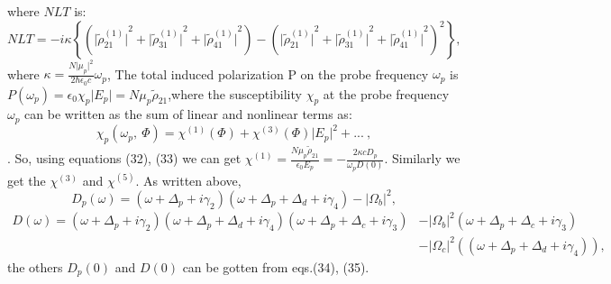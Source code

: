 \documentclass[12pt,a4paper]{article}
\begin{document}
where \(NLT\) is:
\begin{equation}
      {NLT} =  {-i\kappa}{\left\lbrace{{\left({\vert\tilde\rho^{(1)}_{21}\vert}^{2}+{\vert\tilde\rho^{(1)}_{31}\vert}^{2}+{\vert\tilde\rho^{(1)}_{41}\vert}^{2}\right)}-{\left({\vert\tilde\rho^{(1)}_{21}\vert}^{2}+{\vert\tilde\rho^{(1)}_{31}\vert}^{2}+{\vert\tilde\rho^{(1)}_{41}\vert}^{2}\right)}^2}\right\rbrace},
\end{equation}
where \(\kappa=\frac{N\vert\mu_p\vert^2}{2\hbar\epsilon_0c}\omega_p\), The total induced polarization P on the probe frequency \(\omega_p\) is \({P}(\omega_p)=\epsilon_0\chi_p\vert E_p\vert=N\mu_p\tilde\rho_{21}\),where the susceptibility \(\chi_p\) at the probe frequency \(\omega_p\) can be written as the sum of linear and nonlinear terms as:
\begin{equation}
    \chi_p(\omega_p,\ \Phi)=\chi^{(1)}(\Phi)+\chi^{(3)}(\Phi)\vert E_p\vert^2+...\ ,
\end{equation}.
So, using equations (32), (33) we can get \(\chi^{(1)}=\frac{N\mu_p\tilde\rho_{21}}{\epsilon_0E_p}=-\frac{2\kappa cD_p}{\omega_pD(0)}\). Similarly we get the \(\chi^{(3)}\) and \(\chi^{(5)}\).
As written above, 
\begin{equation}
    D_p(\omega)=(\omega+\Delta_p+i\gamma_2)(\omega+\Delta_p+\Delta_d+i\gamma_4)-|\Omega_b|^2,
\end{equation}
\begin{align}
    D(\omega)=(\omega+\Delta_p+i\gamma_2)(\omega+\Delta_p+\Delta_d+i\gamma_4)(\omega+\Delta_p+\Delta_c+i\gamma_3)&-|\Omega_b|^2(\omega+\Delta_p+\Delta_c+i\gamma_3)\nonumber\\ &-|\Omega_c|^2((\omega+\Delta_p+\Delta_d+i\gamma_4)),
\end{align}
the others \(D_p(0)\) and \(D(0)\) can be gotten from eqs.(34), (35). 
\newpage
\end{document}
